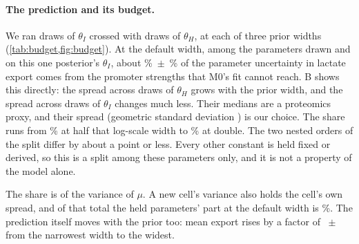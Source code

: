 \paragraph{The prediction and its budget.} We ran  draws of $\theta_I$ crossed with
 draws of $\theta_H$, at each of three prior widths
(\cref{tab:budget,fig:budget}). At the default width, among the 
parameters drawn and on this one posterior's $\theta_I$, about
\%~$\pm$~\% of the parameter uncertainty in
lactate export comes from the  promoter strengths that M0's fit cannot
reach. B shows this directly: the spread across draws of $\theta_H$ grows with the prior width, and the spread across draws of $\theta_I$ changes much less. Their medians are a proteomics proxy, and their spread (geometric standard
deviation ) is our choice. The share runs from
\% at half that log-scale width to \% at double. The
two nested orders of the split differ by about a point or less. Every other constant is
held fixed or derived, so this is a split among these  parameters
only, and it is not a property of the model alone.

The share is of the variance of $\mu$. A new cell's variance also holds the cell's own
spread, and of that total the held parameters' part at the default width is
\%. The prediction itself moves with the prior too: mean export
rises by a factor of ~$\pm$~ from the
narrowest width to the widest.

